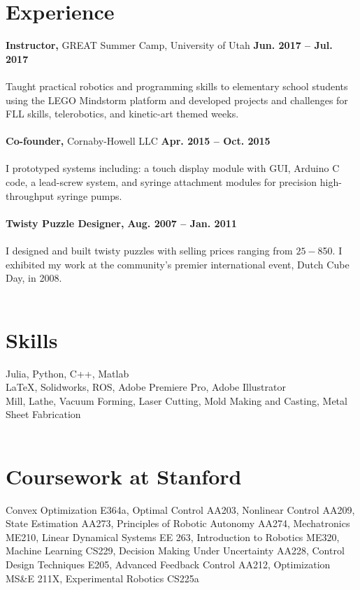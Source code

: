 \documentclass[margin,line]{res}
\begin{document}
\begin{resume}
\section{\sc Experience}
{\bf Instructor,} GREAT Summer Camp, University of Utah
\hfill {\bf Jun. 2017 – Jul. 2017}\\
\\
Taught practical robotics and programming skills to elementary school students using the LEGO Mindstorm platform and developed projects and challenges for FLL skills, telerobotics, and kinetic-art themed weeks.\\
\\
{\bf Co-founder,} Cornaby-Howell LLC
\hfill {\bf Apr. 2015 – Oct. 2015}\\
\\
I prototyped systems including: a touch display module with GUI, Arduino C code, a lead-screw system,
and syringe attachment modules for precision high-throughput syringe pumps.\\
\\
{\bf Twisty Puzzle Designer,} 
\hfill {\bf Aug. 2007 – Jan. 2011}\\
\\
I designed and built twisty puzzles with selling prices ranging from $25 - $850. I exhibited my work at
the community’s premier international event, Dutch Cube Day, in 2008.\\
\\

\section{\sc Skills}
Julia, Python, C++, Matlab\\
\LaTeX, Solidworks, ROS, Adobe Premiere Pro, Adobe Illustrator \\
Mill, Lathe, Vacuum Forming, Laser Cutting, Mold Making and Casting, Metal Sheet Fabrication\\
\\
\section{\sc Coursework at Stanford}
Convex Optimization E364a, Optimal Control AA203, Nonlinear Control AA209, State Estimation AA273, Principles of Robotic Autonomy AA274, Mechatronics ME210, Linear Dynamical Systems EE 263, Introduction to Robotics ME320, Machine Learning CS229, Decision Making Under Uncertainty AA228, Control Design Techniques E205, Advanced Feedback Control AA212, Optimization MS\&E 211X, Experimental Robotics CS225a
\\

\end{resume}
\end{document}
